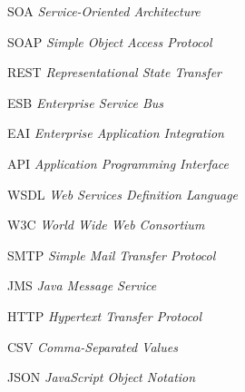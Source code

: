 \begin{siglas}
  \item[SOA] \textit{Service-Oriented Architecture}
  \item[SOAP] \textit{Simple Object Access Protocol}
  \item[REST] \textit{Representational State Transfer}
  \item[ESB] \textit{Enterprise Service Bus}
  \item[EAI] \textit{Enterprise Application Integration}
  \item[API] \textit{Application Programming Interface}
  \item[WSDL] \textit{Web Services Definition Language}
  \item[W3C] \textit{World Wide Web Consortium}
  \item[SMTP] \textit{Simple Mail Transfer Protocol}
  \item[JMS] \textit{Java Message Service}
  \item[HTTP] \textit{Hypertext Transfer Protocol}
  \item[CSV] \textit{Comma-Separated Values}
  \item[JSON] \textit{JavaScript Object Notation}
\end{siglas}
